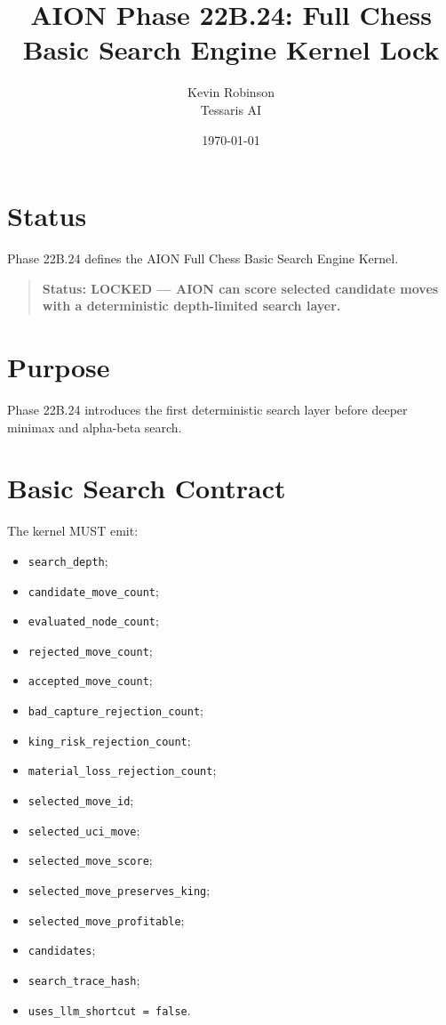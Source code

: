 \documentclass[11pt,a4paper]{article}
\title{\textbf{AION Phase 22B.24: Full Chess Basic Search Engine Kernel Lock}}
\author{Kevin Robinson\\Tessaris AI}
\date{\today}
\begin{document}
\maketitle

\section{Status}

Phase 22B.24 defines the AION Full Chess Basic Search Engine Kernel.

\begin{quote}
\textbf{Status: LOCKED --- AION can score selected candidate moves with a deterministic depth-limited search layer.}
\end{quote}

\section{Purpose}

Phase 22B.24 introduces the first deterministic search layer before deeper minimax and alpha-beta search.

\section{Basic Search Contract}

The kernel MUST emit:

\begin{itemize}
  \item \texttt{search\_depth};
  \item \texttt{candidate\_move\_count};
  \item \texttt{evaluated\_node\_count};
  \item \texttt{rejected\_move\_count};
  \item \texttt{accepted\_move\_count};
  \item \texttt{bad\_capture\_rejection\_count};
  \item \texttt{king\_risk\_rejection\_count};
  \item \texttt{material\_loss\_rejection\_count};
  \item \texttt{selected\_move\_id};
  \item \texttt{selected\_uci\_move};
  \item \texttt{selected\_move\_score};
  \item \texttt{selected\_move\_preserves\_king};
  \item \texttt{selected\_move\_profitable};
  \item \texttt{candidates};
  \item \texttt{search\_trace\_hash};
  \item \texttt{uses\_llm\_shortcut = false}.
\end{itemize}
\end{document}
